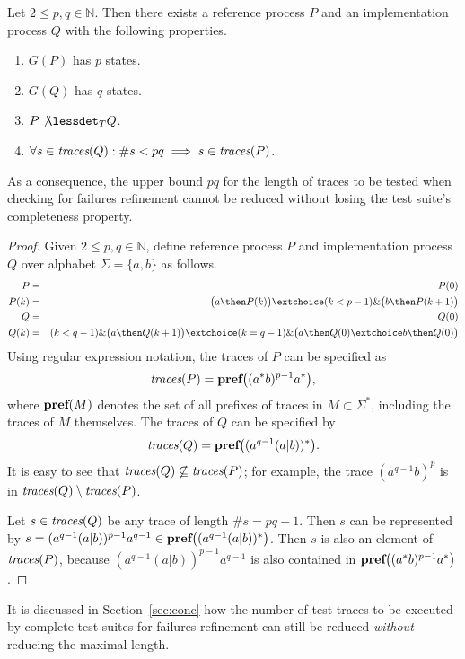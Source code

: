 \begin{theorem}
Let $2\le p,q \in\mathbb{N}$. Then there exists a reference process $P$ and an
implementation process $Q$ with the following properties.
\begin{enumerate}
\item $G(P)$ has $p$ states.
\item $G(Q)$ has $q$ states.
\item $P\not\lessdet_T Q$.
\item $\forall s\in\text{\it traces}(Q): \#s < pq\implies s\in\text{\it traces}(P)$.
\end{enumerate}
As a consequence, the upper bound $pq$ for the length of traces to be tested when checking for failures refinement cannot be reduced without losing the test suite's completeness property.
\end{theorem}
\begin{proof}
Given $2\le p,q \in\mathbb{N}$, define reference process $P$ and implementation process $Q$
over alphabet $\Sigma =\{ a,b\}$ as follows.
\begin{eqnarray*}
P & = &  P(0) 
\\
P(k) & = & \big( a \then P(k) \big) \extchoice (k < p-1) \& \big( b \then P(k+1)\big)
\\ 
Q & = & Q(0)
\\
Q(k) & = & (k < q-1) \& \big( a \then Q(k+1)    \big) \extchoice 
( k = q-1)\& \big( a\then Q(0) \extchoice b\then Q(0)  \big)
\end{eqnarray*}
Using regular expression notation, the traces of $P$ can be specified as
\[
\text{\it traces}(P) = \text{\bf pref}\big(  (a^*b)^{p-1}a^* \big),
\]
where $\text{\bf pref}(M)$ denotes the set of all prefixes of traces in $M\subset\Sigma^*$, 
including the traces of $M$ themselves.
The traces of $Q$ can be specified by
\[
\text{\it traces}(Q) = \text{\bf pref}\big( (a^{q-1}(a|b))^*  \big).
\]
It is easy to see that $\text{\it traces}(Q)\not\subseteq\text{\it traces}(P)$; 
for example, the trace $(a^{q-1}b)^p$ is in
$\text{\it traces}(Q)\setminus\text{\it traces}(P)$.

Let $s \in\text{\it traces}(Q)$ be any trace of length $\#s = pq-1$. Then $s$ can be represented 
by $s = (a^{q-1}(a|b))^{p-1}a^{q-1} \in \text{\bf pref}\big( (a^{q-1}(a|b))^*  \big)$. 
Then $s$ is also an element of $\text{\it traces}(P)$, because $(a^{q-1}(a|b))^{p-1}a^{q-1}$ 
is also contained in $\text{\bf pref}\big(  (a^*b)^{p-1}a^* \big)$.
\xbox
\end{proof}

It is discussed in Section~\ref{sec:conc} how the number of test traces to be executed 
by complete test suites for failures refinement   can still be reduced {\it without} reducing 
the maximal length.


